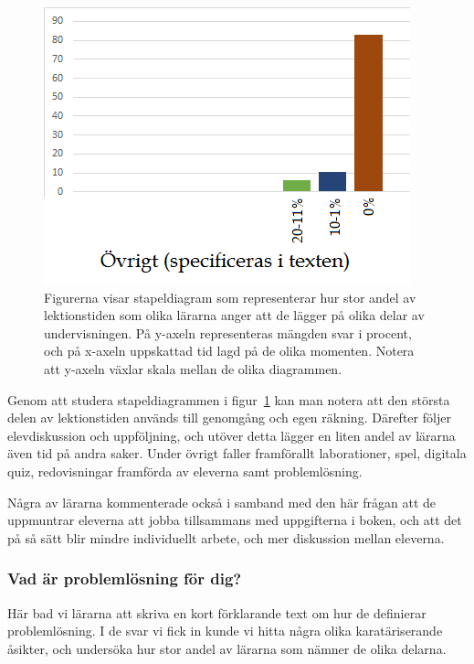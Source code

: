 \begin{figure}
    \includegraphics{Figures/Barcharts/ovrigt.png}
    \caption{Figurerna visar stapeldiagram som representerar hur stor andel av lektionstiden som olika lärarna anger att de lägger på olika delar av undervisningen. På y-axeln representeras mängden svar i procent, och på x-axeln uppskattad tid lagd på de olika momenten. Notera att y-axeln växlar skala mellan de olika diagrammen.} %
    \label{fig:PC}
\end{figure}

    \textcolor{lila}{Genom att studera stapeldiagrammen i figur~\ref{fig:PC} kan man notera att den största delen av lektionstiden används till genomgång och egen räkning. Därefter följer elevdiskussion och uppföljning, och utöver detta lägger en liten andel av lärarna även tid på andra saker. Under övrigt faller framförallt laborationer, spel, digitala quiz, redovisningar framförda av eleverna samt problemlösning.}

    \textcolor{lila}{Några av lärarna kommenterade också i samband med den här frågan att de uppmuntrar eleverna att jobba tillsammans med uppgifterna i boken, och att det på så sätt blir mindre individuellt arbete, och mer diskussion mellan eleverna.}

\subsubsection{Vad är problemlösning för dig?}
    \textcolor{lila}{Här bad vi lärarna att skriva en kort förklarande text om hur de definierar problemlösning. I de svar vi fick in kunde vi hitta några olika karatäriserande åsikter, och undersöka hur stor andel av lärarna som nämner de olika delarna.}

